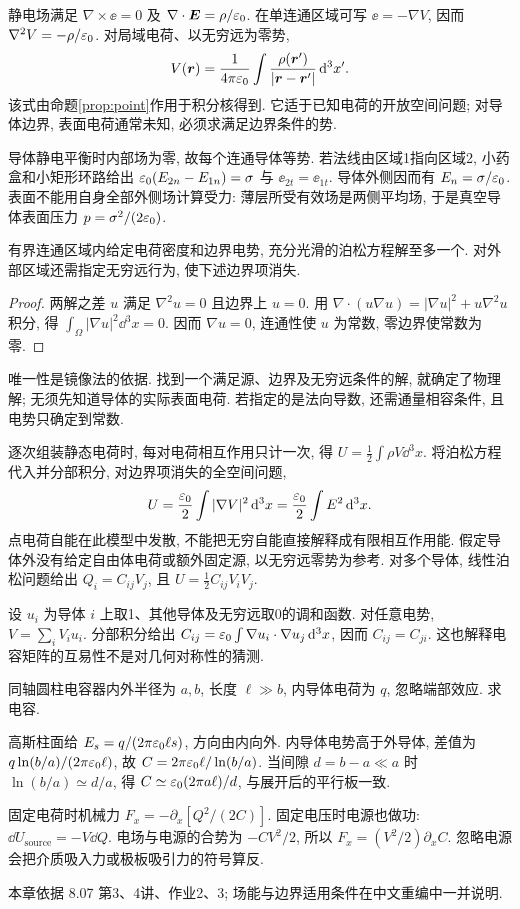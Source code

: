 静电场满足 $\nabla\times\ee=0$ 及 $\nabla\cdot\boldsymbol{E}=\rho/\varepsilon_0$. 在单连通区域可写 $\ee=-\nabla V$, 因而 $\nabla^2V=-\rho/\varepsilon_0$. 对局域电荷、以无穷远为零势,
\[
V(\boldsymbol{r})=\frac1{4\pi\varepsilon_0}\int\frac{\rho(\boldsymbol{r}')}{|\boldsymbol{r}-\boldsymbol{r}'|}\,\mathrm d^3x'.
\]
该式由命题\ref{prop:point}作用于积分核得到. 它适于已知电荷的开放空间问题; 对导体边界, 表面电荷通常未知, 必须求满足边界条件的势.

导体静电平衡时内部场为零, 故每个连通导体等势. 若法线由区域1指向区域2, 小药盒和小矩形环路给出 $\varepsilon_0(E_{2n}-E_{1n})=\sigma$ 与 $\ee_{2t}=\ee_{1t}$. 导体外侧因而有 $E_n=\sigma/\varepsilon_0$. 表面不能用自身全部外侧场计算受力: 薄层所受有效场是两侧平均场, 于是真空导体表面压力 $p=\sigma^2/(2\varepsilon_0)$.

\begin{theorem}[狄利克雷唯一性]
有界连通区域内给定电荷密度和边界电势, 充分光滑的泊松方程解至多一个. 对外部区域还需指定无穷远行为, 使下述边界项消失.
\end{theorem}
\begin{proof}
两解之差 $u$ 满足 $\nabla^2u=0$ 且边界上 $u=0$. 用 $\nabla\cdot(u\nabla u)=|\nabla u|^2+u\nabla^2u$ 积分, 得 $\int_\Omega|\nabla u|^2\dd^3x=0$. 因而 $\nabla u=0$, 连通性使 $u$ 为常数, 零边界使常数为零.
\end{proof}
唯一性是镜像法的依据. 找到一个满足源、边界及无穷远条件的解, 就确定了物理解; 无须先知道导体的实际表面电荷. 若指定的是法向导数, 还需通量相容条件, 且电势只确定到常数.

逐次组装静态电荷时, 每对电荷相互作用只计一次, 得 $U=\frac12\int\rho V\dd^3x$. 将泊松方程代入并分部积分, 对边界项消失的全空间问题,
\[
U=\frac{\varepsilon_0}2\int|\nabla V|^2\,\mathrm d^3x=\frac{\varepsilon_0}2\int E^2\,\mathrm d^3x.
\]
点电荷自能在此模型中发散, 不能把无穷自能直接解释成有限相互作用能. 假定导体外没有给定自由体电荷或额外固定源, 以无穷远零势为参考. 对多个导体, 线性泊松问题给出 $Q_i=C_{ij}V_j$, 且 $U=\frac12 C_{ij}V_iV_j$.

设 $u_i$ 为导体 $i$ 上取1、其他导体及无穷远取0的调和函数. 对任意电势, $V=\sum_iV_iu_i$. 分部积分给出 $C_{ij}=\varepsilon_0\int\nabla u_i\cdot\nabla u_j\,\mathrm d^3x$, 因而 $C_{ij}=C_{ji}$. 这也解释电容矩阵的互易性不是对几何对称性的猜测.

\begin{example}
同轴圆柱电容器内外半径为 $a,b$, 长度 $\ell\gg b$, 内导体电荷为 $q$, 忽略端部效应. 求电容.
\end{example}
\begin{solution}
高斯柱面给 $E_s=q/(2\pi\varepsilon_0\ell s)$, 方向由内向外. 内导体电势高于外导体, 差值为 $q\ln(b/a)/(2\pi\varepsilon_0\ell)$, 故 $C=2\pi\varepsilon_0\ell/\ln(b/a)$. 当间隙 $d=b-a\ll a$ 时 $\ln(b/a)\simeq d/a$, 得 $C\simeq\varepsilon_0(2\pi a\ell)/d$, 与展开后的平行板一致.
\end{solution}
固定电荷时机械力 $F_x=-\partial_x[Q^2/(2C)]$. 固定电压时电源也做功: $\dd U_\mathrm{source}=-V\dd Q$. 电场与电源的合势为 $-CV^2/2$, 所以 $F_x=(V^2/2)\partial_xC$. 忽略电源会把介质吸入力或极板吸引力的符号算反.



本章依据 8.07 第3、4讲、作业2、3; 场能与边界适用条件在中文重编中一并说明.
